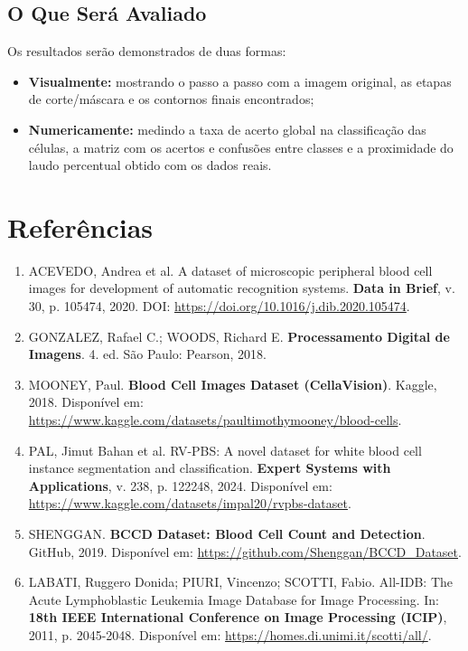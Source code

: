 \documentclass[12pt, a4paper]{article}
\begin{document}
\subsection{O Que Ser\'{a} Avaliado}
Os resultados ser\~{a}o demonstrados de duas formas:
\begin{itemize}
    \item \textbf{Visualmente:} mostrando o passo a passo com a imagem original, as etapas de corte/m\'{a}scara e os contornos finais encontrados;
    \item \textbf{Numericamente:} medindo a taxa de acerto global na classifica\c{c}\~{a}o das c\'{e}lulas, a matriz com os acertos e confus\~{o}es entre classes e a proximidade do laudo percentual obtido com os dados reais.
\end{itemize}

\section{Refer\^{e}ncias}

\begin{enumerate}
    \item ACEVEDO, Andrea et al. A dataset of microscopic peripheral blood cell images for development of automatic recognition systems. \textbf{Data in Brief}, v. 30, p. 105474, 2020. DOI: \url{https://doi.org/10.1016/j.dib.2020.105474}.
    
    \item GONZALEZ, Rafael C.; WOODS, Richard E. \textbf{Processamento Digital de Imagens}. 4. ed. S\~{a}o Paulo: Pearson, 2018.
    
    \item MOONEY, Paul. \textbf{Blood Cell Images Dataset (CellaVision)}. Kaggle, 2018. Dispon\'{i}vel em: \url{https://www.kaggle.com/datasets/paultimothymooney/blood-cells}.
    
    \item PAL, Jimut Bahan et al. RV-PBS: A novel dataset for white blood cell instance segmentation and classification. \textbf{Expert Systems with Applications}, v. 238, p. 122248, 2024. Dispon\'{i}vel em: \url{https://www.kaggle.com/datasets/impal20/rvpbs-dataset}.
    
    \item SHENGGAN. \textbf{BCCD Dataset: Blood Cell Count and Detection}. GitHub, 2019. Dispon\'{i}vel em: \url{https://github.com/Shenggan/BCCD_Dataset}.
    
    \item LABATI, Ruggero Donida; PIURI, Vincenzo; SCOTTI, Fabio. All-IDB: The Acute Lymphoblastic Leukemia Image Database for Image Processing. In: \textbf{18th IEEE International Conference on Image Processing (ICIP)}, 2011, p. 2045-2048. Dispon\'{i}vel em: \url{https://homes.di.unimi.it/scotti/all/}.
\end{enumerate}
\end{document}

